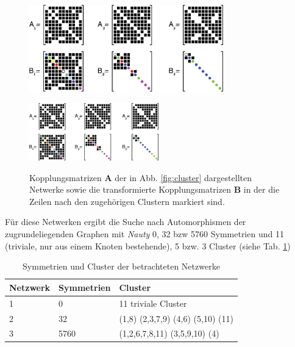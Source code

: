 \begin{figure}
	\centering
	\includegraphics[width=0.75\textwidth]{abb/misc/ABMat.png}
	\caption{Kopplungsmatrizen $\boldsymbol{A}$ der in Abb. \ref{fig:cluster} dargestellten Netwerke sowie die transformierte Kopplungsmatrizen $\boldsymbol{B}$ in der die Zeilen nach den zugehörigen Clustern markiert sind\cite{pecora2014}.}
	\includegraphics[width=0.5\textwidth]{abb/misc/ABMat.png}
\label{fig:abmat}
\end{figure}

Für diese Netwerken ergibt die Suche nach Automorphismen der zugrundeliegenden Graphen mit \textit{Nauty} 0, 32 bzw 5760 Symmetrien und 11 (triviale, nur aus einem Knoten bestehende), 5 bzw. 3 Cluster (siehe Tab. \ref{tab:netzwerke})

\begin{table}[]
	\begin{center}
	\caption{Symmetrien und Cluster der betrachteten Netzwerke}
	\label{tab:netzwerke}
\begin{tabular}{lll}
	Netzwerk & Symmetrien & Cluster                           \\
	\hline
	1        & 0          & 11 triviale Cluster               \\
	2        & 32         & (1,8) (2,3,7,9) (4,6) (5,10) (11) \\
	3        & 5760       & (1,2,6,7,8,11) (3,5,9,10) (4) \\  
	\hline
\end{tabular}
	\end{center}
\end{table}

